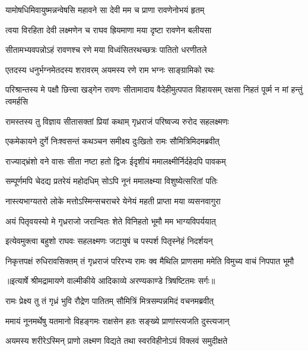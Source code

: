 \twolineshloka
{यामोषधिमिवायुष्मन्नन्वेषसि महावने}
{सा देवी मम च प्राणा रावणेनोभयं हृतम्} %

\twolineshloka
{त्वया विरहिता देवी लक्ष्मणेन च राघव}
{ह्रियमाणा मया दृष्टा रावणेन बलीयसा} %

\twolineshloka
{सीतामभ्यवपन्नोऽहं रावणश्च रणे मया}
{विध्वंसितरथच्छत्रः पातितो धरणीतले} %

\twolineshloka
{एतदस्य धनुर्भग्नमेतदस्य शरावरम्}
{अयमस्य रणे राम भग्नः साङ्ग्रामिको रथः} %

\threelineshloka
{परिश्रान्तस्य मे पक्षौ छित्त्वा खड्गेन रावणः}
{सीतामादाय वैदेहीमुत्पपात विहायसम्}
{रक्षसा निहतं पूर्व्म न मां हन्तुं त्वमर्हसि} %

\twolineshloka
{रामस्तस्य तु विज्ञाय सीतासक्तां प्रियां कथाम्}
{गृध्रराजं परिष्वज्य रुरोद सहलक्ष्मणः} %

\twolineshloka
{एकमेकायने दुर्गे निःश्वसन्तं कथञ्चन}
{समीक्ष्य दुःखितो रामः सौमित्रिमिदमब्रवीत्} %

\twolineshloka
{राज्याद्भ्रंशो वने वासः सीता नष्टा हतो द्विजः}
{ईदृशीयं ममालक्ष्मीर्निर्दहेदपि पावकम्} %

\twolineshloka
{सम्पूर्णमपि चेदद्य प्रतरेयं महोदधिम्}
{सोऽपि नूनं ममालक्ष्म्या विशुष्येत्सरितां पतिः} %

\twolineshloka
{नास्त्यभाग्यतरो लोके मत्तोऽस्मिन्सचराचरे}
{येनेयं महती प्राप्ता मया व्यसनवागुरा} %

\twolineshloka
{अयं पितृवयस्यो मे गृध्रराजो जरान्वितः}
{शेते विनिहतो भूमौ मम भाग्यविपर्ययात्} %

\twolineshloka
{इत्येवमुक्त्वा बहुशो राघवः सहलक्ष्मणः}
{जटायुषं च पस्पर्श पितृस्नेहं निदर्शयन्} %

\fourlineindentedshloka
{निकृत्तपक्षं रुधिरावसिक्तम्}
{तं गृध्रराजं परिरभ्य रामः}
{क्व मैथिलि प्राणसमा ममेति}
{विमुच्य वाचं निपपात भूमौ} %


{॥इत्यार्षे श्रीमद्रामायणे वाल्मीकीये आदिकाव्ये अरण्यकाण्डे त्रिषष्टितमः सर्गः॥}


\twolineshloka
{रामः प्रेक्ष्य तु तं गृध्रं भुवि रौद्रेण पातितम्}
{सौमित्रिं मित्रसम्पन्नमिदं वचनमब्रवीत्} %

\twolineshloka
{ममायं नूनमर्थेषु यतमानो विहङ्गमः}
{राक्षसेन हतः सङ्ख्ये प्राणांस्त्यजति दुस्त्यजान्} %

\twolineshloka
{अयमस्य शरीरेऽस्मिन् प्राणो लक्ष्मण विद्यते}
{तथा स्वरविहीनोऽयं विक्लवं समुदीक्षते} %

